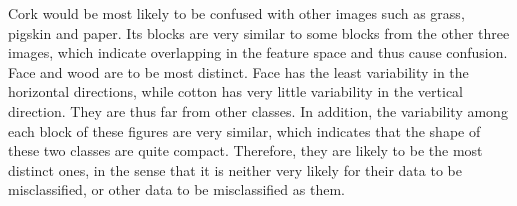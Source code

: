 \label{sec:features}
Cork would be most likely to be confused with other images such as grass, pigskin and paper. Its blocks are very similar to some blocks from the other three images, which indicate overlapping in the feature space and thus cause confusion.
Face and wood are to be most distinct. Face has the least variability in the horizontal directions, while cotton has very little variability in the vertical direction. They are thus far from other classes. In addition, the variability among each block of these figures are very similar, which indicates that the shape of these two classes are quite compact. Therefore, they are likely to be the most distinct ones, in the sense that it is neither very likely for their data to be misclassified, or other data to be misclassified as them.